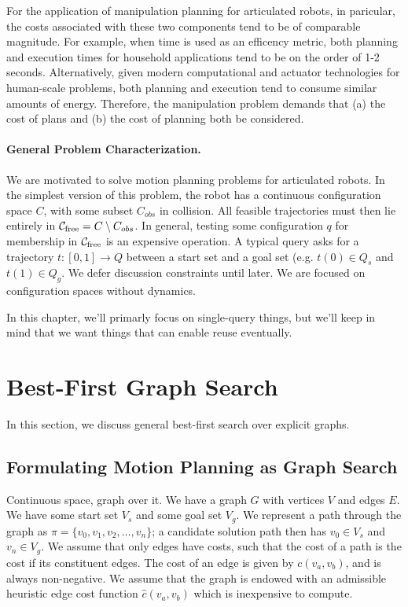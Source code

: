 \documentclass{report}
\begin{document}
For the application of manipulation planning for articulated robots,
in paricular,
the costs associated with these two components tend to be of comparable
magnitude.
For example,
when time is used as an efficency metric,
both planning and execution times for household applications
tend to be on the order of 1-2 seconds.
Alternatively, given
modern computational and actuator technologies for human-scale problems,
both planning and execution tend to consume similar amounts of energy.
Therefore,
the manipulation problem demands that
(a) the cost of plans and
(b) the cost of planning both be considered.

\paragraph{General Problem Characterization.}

We are motivated to solve motion planning problems for articulated robots.
In the simplest version of this problem,
the robot has a continuous configuration space $C$,
with some subset $C_{obs}$ in collision.
All feasible trajectories must then lie entirely in
$\mathcal{C}_{\mbox{\scriptsize free}} = C \setminus C_{obs}$.
In general, testing some configuration $q$ for membership in
$\mathcal{C}_{\mbox{\scriptsize free}}$
is an expensive operation.
A typical query asks for a trajectory $t: [0,1] \rightarrow Q$ between
a start set and a goal set (e.g. $t(0) \in Q_s$ and $t(1) \in Q_g$.
We defer discussion constraints until later.
We are focused on configuration spaces without dynamics.

In this chapter,
we'll primarly focus on single-query things,
but we'll keep in mind that we want things that can enable reuse eventually.

\section{Best-First Graph Search}
\label{sec:best-first}

In this section,
we discuss general best-first search over explicit graphs.

\subsection{Formulating Motion Planning as Graph Search}

Continuous space, graph over it.
We have a graph $G$ with vertices $V$ and edges $E$.
We have some start set $V_s$ and some goal set $V_g$.
We represent a path through the graph as
$\pi = \{ v_0, v_1, v_2, \dots, v_n \}$;
a candidate solution path then has $v_0 \in V_s$ and $v_n \in V_g$.
We assume that only edges have costs,
such that the cost of a path is the cost if its constituent edges.
The cost of an edge is given by $c(v_a,v_b)$, and is always non-negative.
We assume that the graph is endowed with an admissible heuristic edge cost
function
$\hat{c}(v_a,v_b)$
which is inexpensive to compute.
\end{document}
